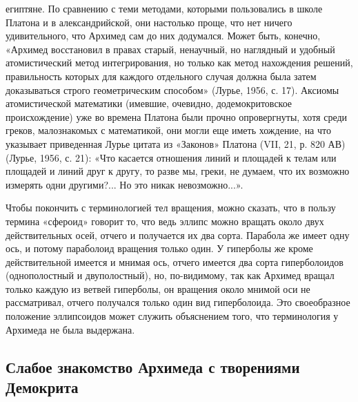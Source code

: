 египтяне. По сравнению с теми  методами, которыми пользовались в школе
Платона  и в  александрийской,  они настолько  проще,  что нет  ничего
удивительного, что Архимед сам до  них додумался. Может быть, конечно,
«Архимед  восстановил  в  правах  старый, ненаучный,  но  наглядный  и
удобный  атомистический  метод  интегрирования, но  только  как  метод
нахождения решений, правильность которых для каждого отдельного случая
должна была затем доказываться строго геометрическим способом» (Лурье,
1956, с.  17). Аксиомы  атомистической математики  (имевшие, очевидно,
додемокритовское  происхождение) уже  во времена  Платона были  прочно
опровергнуты, хотя среди греков, малознакомых с математикой, они могли
еще  иметь хождение,  на  что указывает  приведенная  Лурье цитата  из
«Законов» Платона  (VII, 21,  р. 820  АВ) (Лурье,  1956, с.  21): «Что
касается отношения линий и площадей к  телам или площадей и линий друг
к другу, то разве мы, греки,  не думаем, что их возможно измерять одни
другими?... Но это никак невозможно...».

Чтобы покончить  с терминологией  тел вращения,  можно сказать,  что в
пользу термина  «сфероид» говорит  то, что  ведь эллипс  можно вращать
около  двух действительных  осей, отчего  и получается  их два  сорта.
Парабола же имеет одну ось,  и потому параболоид вращения только один.
У  гиперболы же  кроме  действительной имеется  и  мнимая ось,  отчего
имеется два  сорта гиперболоидов  (однополостный и  двуполостный), но,
по-видимому, так как Архимед вращал только каждую из ветвей гиперболы,
он  вращения  около  мнимой  оси  не  рассматривал,  отчего  получался
только один  вид гиперболоида. Это своеобразное  положение эллипсоидов
может служить  объяснением того, что  терминология у Архимеда  не была
выдержана.

\subsection{Слабое знакомство Архимеда с творениями Демокрита}

